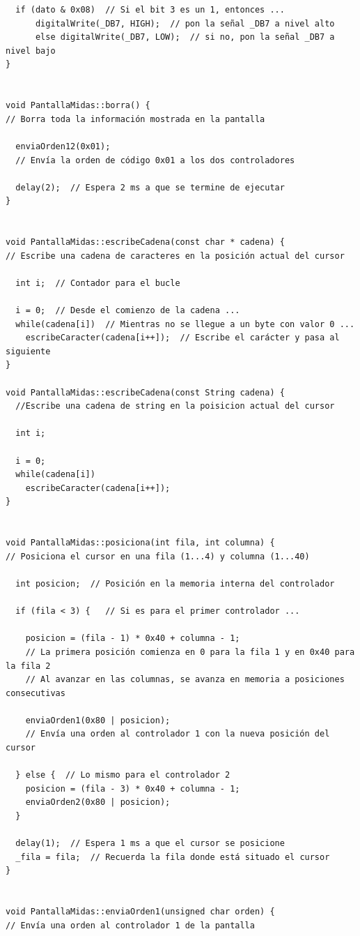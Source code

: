 \documentclass[11pt,twoside]{book}
\begin{document}
\begin{lstlisting}
  if (dato & 0x08)  // Si el bit 3 es un 1, entonces ...
      digitalWrite(_DB7, HIGH);  // pon la señal _DB7 a nivel alto
      else digitalWrite(_DB7, LOW);  // si no, pon la señal _DB7 a nivel bajo
}


void PantallaMidas::borra() {
// Borra toda la información mostrada en la pantalla

  enviaOrden12(0x01); 
  // Envía la orden de código 0x01 a los dos controladores
  
  delay(2);  // Espera 2 ms a que se termine de ejecutar
}


void PantallaMidas::escribeCadena(const char * cadena) {
// Escribe una cadena de caracteres en la posición actual del cursor

  int i;  // Contador para el bucle
  
  i = 0;  // Desde el comienzo de la cadena ...
  while(cadena[i])  // Mientras no se llegue a un byte con valor 0 ...
    escribeCaracter(cadena[i++]);  // Escribe el carácter y pasa al siguiente
}

void PantallaMidas::escribeCadena(const String cadena) {
  //Escribe una cadena de string en la poisicion actual del cursor

  int i;

  i = 0;
  while(cadena[i])
    escribeCaracter(cadena[i++]);
}


void PantallaMidas::posiciona(int fila, int columna) {
// Posiciona el cursor en una fila (1...4) y columna (1...40)

  int posicion;  // Posición en la memoria interna del controlador

  if (fila < 3) {   // Si es para el primer controlador ...
    
    posicion = (fila - 1) * 0x40 + columna - 1;
    // La primera posición comienza en 0 para la fila 1 y en 0x40 para la fila 2
    // Al avanzar en las columnas, se avanza en memoria a posiciones consecutivas
    
    enviaOrden1(0x80 | posicion);
    // Envía una orden al controlador 1 con la nueva posición del cursor
    
  } else {  // Lo mismo para el controlador 2
    posicion = (fila - 3) * 0x40 + columna - 1;
    enviaOrden2(0x80 | posicion);
  }
  
  delay(1);  // Espera 1 ms a que el cursor se posicione
  _fila = fila;  // Recuerda la fila donde está situado el cursor
}


void PantallaMidas::enviaOrden1(unsigned char orden) {
// Envía una orden al controlador 1 de la pantalla


\end{lstlisting}
\end{document}

